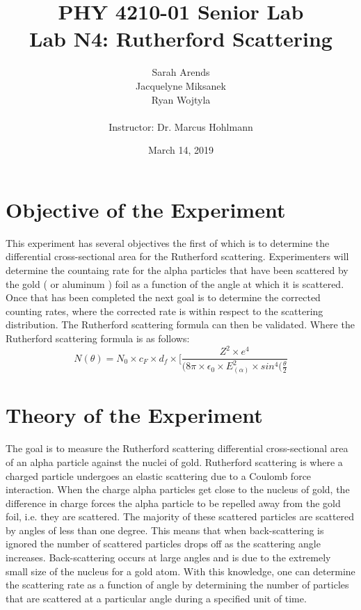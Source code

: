 \documentclass[a4paper]{article}
\title{PHY 4210-01 Senior Lab \\Lab N4: Rutherford Scattering}
\author{Sarah Arends \\ 
        Jacquelyne Miksanek \\
        Ryan Wojtyla \\ \\
        Instructor: Dr. Marcus Hohlmann}
\date{March 14, 2019}
\begin{document}
\maketitle 

\begin{abstract}
  \qq 
\end{abstract}

\newpage

\tableofcontents

\newpage

\section{Objective of the Experiment}
\qq This experiment has several objectives the first of which is to
determine the differential cross-sectional area for the Rutherford
scattering. Experimenters will determine the countaing rate for the
alpha particles that have been scattered by the gold ( or aluminum )
foil as a function of the angle at which it is scattered. Once that
has been completed the next goal is to determine the corrected
counting rates, where the corrected rate is within respect to the
scattering distribution. The Rutherford scattering formula can then be
validated. Where the Rutherford scattering formula is as follows:
\begin{equation}
N(\theta) = N_0 \times c_F \times d_f \times [\frac{Z^2 \times
    e^4}{(8\pi \times \epsilon_0\times E_(\alpha)^2 \times
    sin^4(\frac{\theta}{2}}
\end{equation}

\section{Theory of the Experiment}

\qq The goal is to measure the Rutherford scattering differential
cross-sectional area of an alpha particle against the nuclei of
gold. Rutherford scattering is where a charged particle undergoes an
elastic scattering due to a Coulomb force interaction. When the charge
alpha particles get close to the nucleus of gold, the difference in
charge forces the alpha particle to be repelled away from the gold
foil, i.e. they are scattered. The majority of these scattered
particles are scattered by angles of less than one degree. This means
that when back-scattering is ignored the number of scattered particles
drops off as the scattering angle increases. Back-scattering occurs at
large angles and is due to the extremely small size of the nucleus for
a gold atom. With this knowledge, one can determine the scattering
rate as a function of angle by determining the number of particles
that are scattered at a particular angle during a specified unit of
time.
\end{document}
